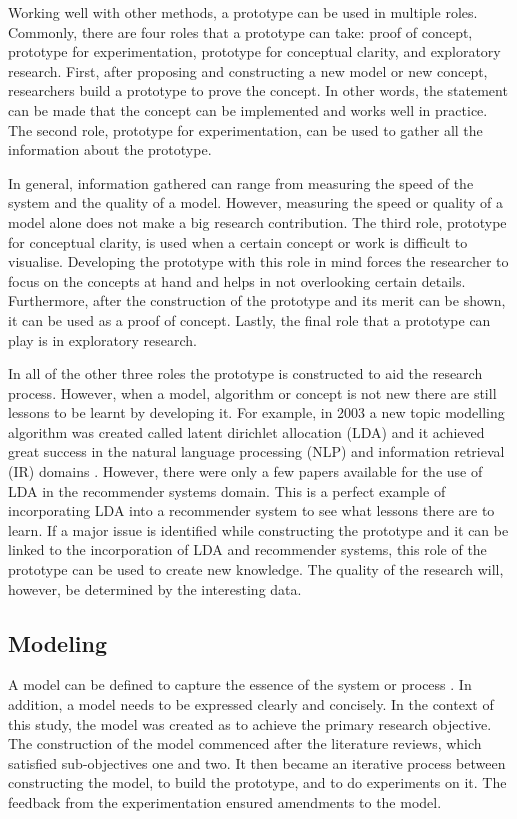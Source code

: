 Working well with other methods, a prototype can be used in multiple roles. Commonly, there are four roles that a prototype can take: proof of concept, prototype for experimentation, prototype for conceptual clarity, and exploratory research. First, after proposing and constructing a new model or new concept, researchers build a prototype to prove the concept. In other words, the statement can be made that the concept can be implemented and works well in practice. The second role, prototype for experimentation, can be used to gather all the information about the prototype.

In general, information gathered can range from measuring the speed of the system and the quality of a model. However, measuring the speed or quality of a model alone does not make a big research contribution. The third role, prototype for conceptual clarity, is used when a certain concept or work is difficult to visualise. Developing the prototype with this role in mind forces the researcher to focus on the concepts at hand and helps in not overlooking certain details. Furthermore, after the construction of the prototype and its merit can be shown, it can be used as a proof of concept. Lastly, the final role that a prototype can play is in exploratory research.

In all of the other three roles the prototype is constructed to aid the research process. However, when a model, algorithm or concept is not new there are still lessons to be learnt by developing it. For example, in 2003 a new topic modelling algorithm was created called latent dirichlet allocation (LDA) and it achieved great success in the natural language processing (NLP) and information retrieval (IR) domains \cite{blei2003latent}. However, there were only a few papers available for the use of LDA in the recommender systems domain. This is a perfect example of incorporating LDA into a recommender system to see what lessons there are to learn. If a major issue is identified while constructing the prototype and it can be linked to the incorporation of LDA and recommender systems, this role of the prototype can be used to create new knowledge. The quality of the research will, however, be determined by the interesting data.

\subsection{Modeling} \label{ssec:model}

A model can be defined to capture the essence of the system or process \cite{olivier2009information}. In addition, a model needs to be expressed clearly and concisely. In the context of this study, the model was created as to achieve the primary research objective. The construction of the model commenced after the literature reviews, which satisfied sub-objectives one and two. It then became an iterative process between constructing the model, to build the prototype, and to do experiments on it. The feedback from the experimentation ensured amendments to the model.

